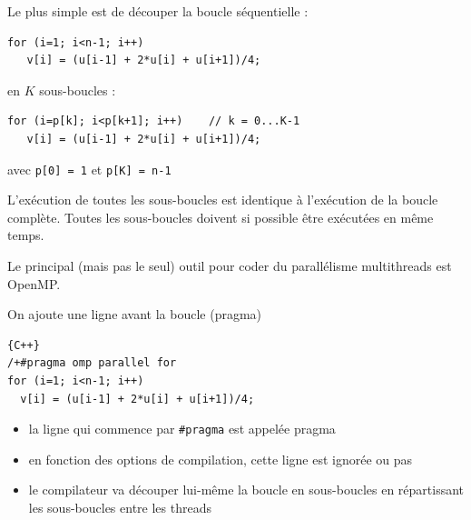 \documentclass{beamer}
\begin{document}
\begin{frame}[fragile]
	Le plus simple est de découper la boucle séquentielle :
	
	\begin{lstlisting}
for (i=1; i<n-1; i++)
   v[i] = (u[i-1] + 2*u[i] + u[i+1])/4;
	\end{lstlisting}
	
\vfill
	en $K$ sous-boucles :
	
\begin{lstlisting}
for (i=p[k]; i<p[k+1]; i++)    // k = 0...K-1
   v[i] = (u[i-1] + 2*u[i] + u[i+1])/4;
\end{lstlisting}

avec {\tt p[0] = 1} et {\tt p[K] = n-1}

\vfill
L'exécution de toutes les sous-boucles est identique à l'exécution de la boucle complète.
Toutes les sous-boucles doivent si possible être exécutées en même temps.
\end{frame}


\begin{frame}[fragile]
	\vfill
	Le principal (mais pas le seul) outil pour coder du parallélisme multithreads est OpenMP.
	
	\vfill
	On ajoute une ligne avant la boucle (pragma)


\begin{center}
\begin{lstlisting}{C++}
/+#pragma omp parallel for
for (i=1; i<n-1; i++)
  v[i] = (u[i-1] + 2*u[i] + u[i+1])/4;
\end{lstlisting}
\end{center}

\begin{itemize}
	\item la ligne qui commence par \verb|#pragma| est appelée pragma
	\item en fonction des options de compilation, cette ligne est ignorée ou pas
    \item le compilateur va découper lui-même la boucle en sous-boucles en répartissant les sous-boucles entre les threads
\end{itemize}

\end{frame}
\end{document}

